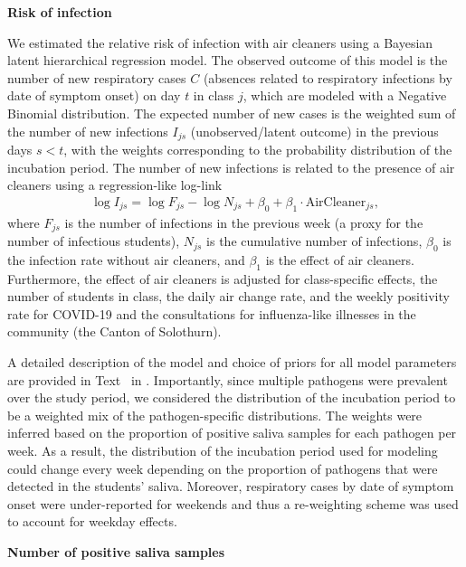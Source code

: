 \documentclass[fleqn,11pt]{wlscirep}
\begin{document}
\noindent\textbf{Risk of infection} \smallskip

\noindent We estimated the relative risk of infection with air cleaners using a Bayesian latent hierarchical regression model. The observed outcome of this model is the number of new respiratory cases $C$ (absences related to respiratory infections by date of symptom onset) on day $t$ in class $j$, which are modeled with a Negative Binomial distribution. The expected number of new cases is the weighted sum of the number of new infections $I_{js}$ (unobserved/latent outcome) in the previous days $s<t$, with the weights corresponding to the probability distribution of the incubation period. The number of new infections is related to the presence of air cleaners using a regression-like log-link
\begin{align}
    \log I_{js} = \log F_{js} - \log N_{js} + \beta_0 + \beta_1 \cdot \text{AirCleaner}_{js},
\end{align}
where $F_{js}$ is the number of infections in the previous week (a proxy for the number of infectious students), $N_{js}$ is the cumulative number of infections, $\beta_0$ is the infection rate without air cleaners, and $\beta_1$ is the effect of air cleaners. Furthermore, the effect of air cleaners is adjusted for class-specific effects, the number of students in class, the daily air change rate, and the weekly positivity rate for COVID-19 and the consultations for influenza-like illnesses in the community (\ie the Canton of Solothurn).

A detailed description of the model and choice of priors for all model parameters are provided in Text~ in \supp. Importantly, since multiple pathogens were prevalent over the study period, we considered the distribution of the incubation period to be a weighted mix of the pathogen-specific distributions. The weights were inferred based on the proportion of positive saliva samples for each pathogen per week. As a result, the distribution of the incubation period used for modeling could change every week depending on the proportion of pathogens that were detected in the students' saliva. Moreover, respiratory cases by date of symptom onset were under-reported for weekends and thus a re-weighting scheme was used to account for weekday effects. \medskip

\noindent\textbf{Number of positive saliva samples} \smallskip
\end{document}
